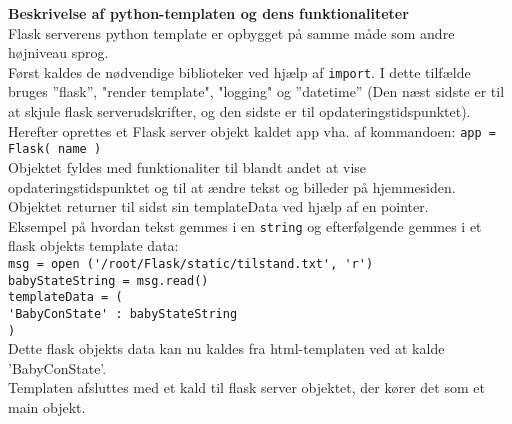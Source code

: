 \textbf{Beskrivelse af python-templaten og dens funktionaliteter}\\
Flask serverens python template er opbygget på samme måde som andre højniveau sprog. \\
Først kaldes de nødvendige biblioteker ved hjælp af \verb+import+. I dette tilfælde bruges ''flask'', "render template", "logging" og ''datetime'' (Den næst sidste er til at skjule flask serverudskrifter, og den sidste er til opdateringstidspunktet). \\ 
Herefter oprettes et Flask server objekt kaldet app vha. af kommandoen: \verb+app = Flask( name )+ \\ 
Objektet fyldes med funktionaliter til blandt andet at vise opdateringstidspunktet og til at ændre tekst og billeder på hjemmesiden. Objektet returner til sidst sin templateData ved hjælp af en pointer. \\
Eksempel på hvordan tekst gemmes i en \verb+string+ og efterfølgende gemmes i et flask objekts template data: \\
 \verb+msg = open ('/root/Flask/static/tilstand.txt', 'r')+ \\
   \verb+babyStateString = msg.read()+ \\
   \verb+templateData = (+ \\
      \verb+'BabyConState' : babyStateString+\\
      \verb+)+ \\ Dette flask objekts data kan nu kaldes fra html-templaten ved at kalde 'BabyConState'. \\
Templaten afsluttes med et kald til flask server objektet, der kører det som et main objekt. \\

